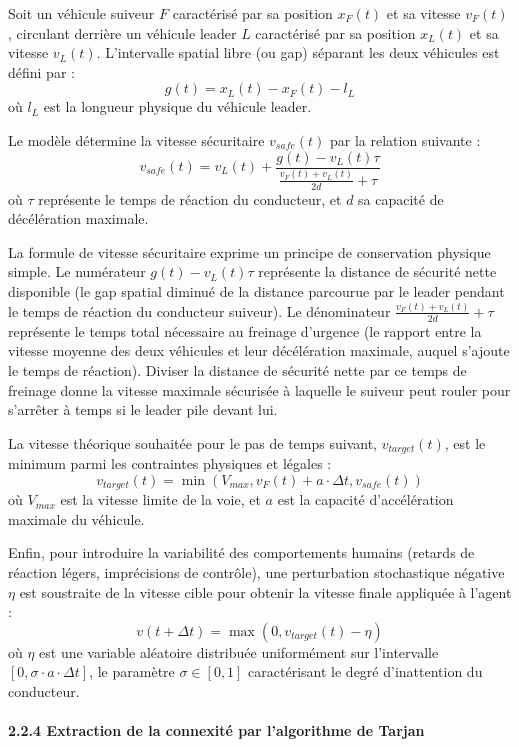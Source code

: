 \documentclass[10pt, a4paper]{article}
\begin{document}
Soit un véhicule suiveur \(F\) caractérisé par sa position \(x_F(t)\) et
sa vitesse \(v_F(t)\), circulant derrière un véhicule leader \(L\)
caractérisé par sa position \(x_L(t)\) et sa vitesse \(v_L(t)\).
L'intervalle spatial libre (ou gap) séparant les deux véhicules est
défini par : \[g(t) = x_L(t) - x_F(t) - l_L\] où \(l_L\) est la longueur
physique du véhicule leader.

Le modèle détermine la vitesse sécuritaire \(v_{safe}(t)\) par la
relation suivante :
\[v_{safe}(t) = v_L(t) + \frac{g(t) - v_L(t)\tau}{\frac{v_F(t) + v_L(t)}{2d} + \tau}\]
où \(\tau\) représente le temps de réaction du conducteur, et \(d\) sa
capacité de décélération maximale.

La formule de vitesse sécuritaire exprime un principe de conservation
physique simple. Le numérateur \(g(t) - v_L(t)\tau\) représente la
distance de sécurité nette disponible (le gap spatial diminué de la
distance parcourue par le leader pendant le temps de réaction du
conducteur suiveur). Le dénominateur
\(\frac{v_F(t) + v_L(t)}{2d} + \tau\) représente le temps total
nécessaire au freinage d'urgence (le rapport entre la vitesse moyenne
des deux véhicules et leur décélération maximale, auquel s'ajoute le
temps de réaction). Diviser la distance de sécurité nette par ce temps
de freinage donne la vitesse maximale sécurisée à laquelle le suiveur
peut rouler pour s'arrêter à temps si le leader pile devant lui.

La vitesse théorique souhaitée pour le pas de temps suivant,
\(v_{target}(t)\), est le minimum parmi les contraintes physiques et
légales :
\[v_{target}(t) = \min\left( V_{max}, v_F(t) + a \cdot \Delta t, v_{safe}(t) \right)\]
où \(V_{max}\) est la vitesse limite de la voie, et \(a\) est la
capacité d'accélération maximale du véhicule.

Enfin, pour introduire la variabilité des comportements humains (retards
de réaction légers, imprécisions de contrôle), une perturbation
stochastique négative \(\eta\) est soustraite de la vitesse cible pour
obtenir la vitesse finale appliquée à l'agent :
\[v(t + \Delta t) = \max\left( 0, v_{target}(t) - \eta \right)\] où
\(\eta\) est une variable aléatoire distribuée uniformément sur
l'intervalle \([0, \sigma \cdot a \cdot \Delta t]\), le paramètre
\(\sigma \in [0, 1]\) caractérisant le degré d'inattention du
conducteur.

\paragraph{2.2.4 Extraction de la connexité par l'algorithme de
Tarjan}\label{extraction-de-la-connexituxe9-par-lalgorithme-de-tarjan}
\end{document}
